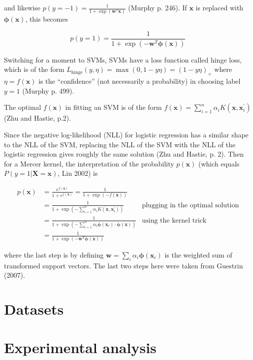 \documentclass[letterpaper, 12pt]{article}
\newcommand{\vect}[1]{\boldsymbol{#1}}
\begin{document}
and likewise $p(y = -1) = \frac{1}{1 + \exp\left(\vect{w}^T\vect{x}\right)}$ (Murphy p. 246). If $\vect{x}$ is replaced with $\vect{\phi}(\vect{x})$, this becomes 

\begin{equation*}
  p(y = 1) = \frac{1}{1 + \exp\left(-\vect{w}^T\vect{\phi}(\vect{x})\right)}
\end{equation*}

Switching for a moment to SVMs, SVMs have a loss function called hinge loss, which is of the form $L_\text{hinge}(y, \eta) = \max(0, 1 - y \eta) = (1 - y\eta)_{+}$ where $\eta = f(\vect{x})$ is the ``confidence'' (not necessarily a probability) in choosing label $y = 1$ (Murphy p. 499).  

The optimal $f(\vect{x})$ in fitting an SVM is of the form $f(\vect{x}) = \sum_{i=1}^{n} \alpha_i K(\vect{x}, \vect{x}_i^\prime)$ (Zhu and Hastie, p.2).

Since the negative log-likelihood (NLL) for logistic regression has a similar shape to the NLL of the SVM, replacing the NLL of the SVM with the NLL of the logistic regression gives roughly the same solution (Zhu and Hastie, p. 2). Then for a Mercer kernel, the interpretation of the probability $p(\vect{x})$ (which equals $P(y = 1 | \vect{X} = \vect{x})$, Lin 2002) is

\begin{align*}
  p(\vect{x}) & = \frac{e^{f(\vect{x})}}{1 + e^{f(\vect{x})}} = \frac{1}{1 + \exp({-f(\vect{x})})} & \\
  & = \frac{1}{1 + \exp(-\sum_{i=1}^{n} \alpha_i K(\vect{x}, \vect{x}_i^\prime))} & \text{plugging in the optimal solution} \\
  & = \frac{1}{1 + \exp(-\sum_{i=1}^{n} \alpha_i \vect{\phi}(\vect{x}_i) \cdot \vect{\phi}(\vect{x}))} & \text{using the kernel trick} \\
  & = \frac{1}{1 + \exp(-\vect{w}^T \vect{\phi}(\vect{x}))} &
\end{align*}

where the last step is by defining $\vect{w} = \sum_{i} \alpha_i \vect{\phi}(\vect{x}_i)$ is the weighted sum of transformed support vectors. The last two steps here were taken from Guestrin (2007).

\section{Datasets}

\section{Experimental analysis}
\end{document}
